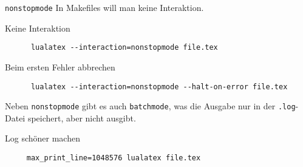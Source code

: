 \begin{frame}[fragile]{\texttt{nonstopmode}}
  In Makefiles will man keine Interaktion.

  \begin{block}{Keine Interaktion}
    \begin{verbatim}
      lualatex --interaction=nonstopmode file.tex
    \end{verbatim}
  \end{block}

  \begin{block}{Beim ersten Fehler abbrechen}
    \begin{verbatim}
      lualatex --interaction=nonstopmode --halt-on-error file.tex
    \end{verbatim}
  \end{block}

  Neben \texttt{nonstopmode} gibt es auch \texttt{batchmode}, was die Ausgabe nur in der \texttt{.log}-Datei speichert, aber nicht ausgibt.

  \begin{block}{Log schöner machen}
    \begin{verbatim}
     max_print_line=1048576 lualatex file.tex
    \end{verbatim}
  \end{block}
\end{frame}
